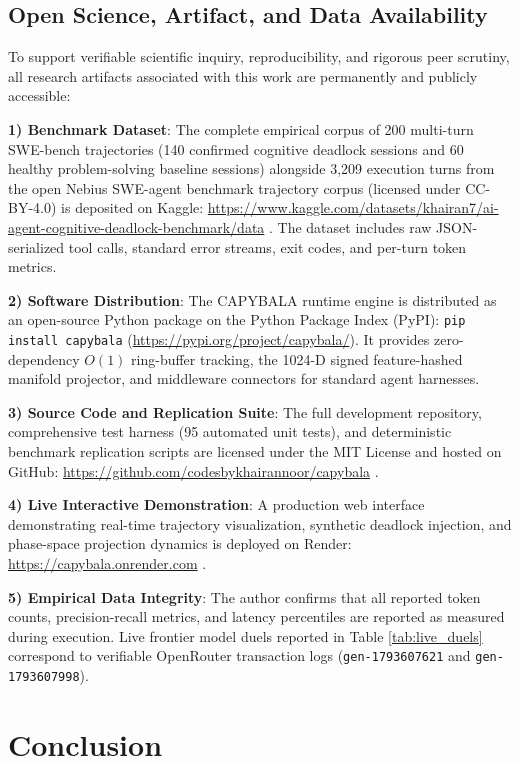 \documentclass[journal]{IEEEtran}
\begin{document}
\subsection{Open Science, Artifact, and Data Availability}
To support verifiable scientific inquiry, reproducibility, and rigorous peer scrutiny, all research artifacts associated with this work are permanently and publicly accessible:

\textbf{1) Benchmark Dataset}: The complete empirical corpus of 200 multi-turn SWE-bench trajectories (140 confirmed cognitive deadlock sessions and 60 healthy problem-solving baseline sessions) alongside 3,209 execution turns from the open Nebius SWE-agent benchmark trajectory corpus (licensed under CC-BY-4.0) is deposited on Kaggle: \url{https://www.kaggle.com/datasets/khairan7/ai-agent-cognitive-deadlock-benchmark/data} \cite{capybala_kaggle_2026}. The dataset includes raw JSON-serialized tool calls, standard error streams, exit codes, and per-turn token metrics.

\textbf{2) Software Distribution}: The CAPYBALA runtime engine is distributed as an open-source Python package on the Python Package Index (PyPI): \texttt{pip install capybala} \cite{capybala_pypi_2026} (\url{https://pypi.org/project/capybala/}). It provides zero-dependency $O(1)$ ring-buffer tracking, the 1024-D signed feature-hashed manifold projector, and middleware connectors for standard agent harnesses.

\textbf{3) Source Code and Replication Suite}: The full development repository, comprehensive test harness (95 automated unit tests), and deterministic benchmark replication scripts are licensed under the MIT License and hosted on GitHub: \url{https://github.com/codesbykhairannoor/capybala} \cite{capybala_github_2026}.

\textbf{4) Live Interactive Demonstration}: A production web interface demonstrating real-time trajectory visualization, synthetic deadlock injection, and phase-space projection dynamics is deployed on Render: \url{https://capybala.onrender.com} \cite{capybala_render_2026}.

\textbf{5) Empirical Data Integrity}: The author confirms that all reported token counts, precision-recall metrics, and latency percentiles are reported as measured during execution. Live frontier model duels reported in Table \ref{tab:live_duels} correspond to verifiable OpenRouter transaction logs (\texttt{gen-1793607621} and \texttt{gen-1793607998}).

\section{Conclusion}
\end{document}
